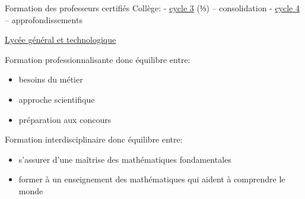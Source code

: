 \documentclass[
  french,
  ignorenonframetext,
]{beamer}
\providecommand{\tightlist}{%
  \setlength{\itemsep}{0pt}\setlength{\parskip}{0pt}}
\begin{document}
\begin{frame}{Formation des professeurs certifiés}
\protect\hypertarget{formation-des-professeurs-certifiuxe9s}{}
Collège: -
\href{https://eduscol.education.fr/pid34150/cycle-3-ecole-elementaire-college.html}{cycle
3} (\(⅓\)) -- consolidation -
\href{https://eduscol.education.fr/pid34185/cycle-4-college.html}{cycle
4} -- approfondissements

\href{https://eduscol.education.fr/pid38708/lycee-general-et-technologique-bac-2021.html}{Lycée
général et technologique}

Formation professionnalisante donc équilibre entre:

\begin{itemize}
\tightlist
\item
  besoins du métier
\item
  approche scientifique
\item
  préparation aux concours
\end{itemize}

Formation interdisciplinaire donc équilibre entre:

\begin{itemize}
\tightlist
\item
  s'assurer d'une maîtrise des mathématiques fondamentales
\item
  former à un enseignement des mathématiques qui aident à comprendre le
  monde
\end{itemize}
\end{frame}
\end{document}
